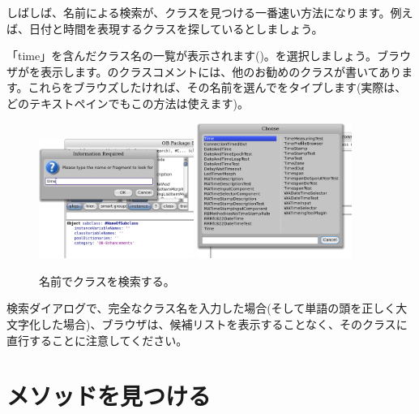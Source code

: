 \documentclass[a4paper,10pt,twoside]{book}
\begin{document}
しばしば、名前による検索が、クラスを見つける一番速い方法になります。例えば、日付と時間を表現するクラスを探しているとしましょう。

\noindent
「time」を含んだクラス名の一覧が表示されます()。を選択しましょう。ブラウザがを表示します。のクラスコメントには、他のお勧めのクラスが書いてあります。これらをブラウズしたければ、その名前を選んでをタイプします(実際は、どのテキストペインでもこの方法は使えます)。

\begin{figure}[hbt]
\centerline{
	\includegraphics[width=0.45\textwidth]{FindIt}
	\hspace{1cm}
	\includegraphics[width=0.45\textwidth]{TimeClasses}
}
\caption{名前でクラスを検索する。
}
\end{figure}

検索ダイアログで、完全なクラス名を入力した場合(そして単語の頭を正しく大文字化した場合)、ブラウザは、候補リストを表示することなく、そのクラスに直行することに注意してください。

\section{メソッドを見つける}
\end{document}
